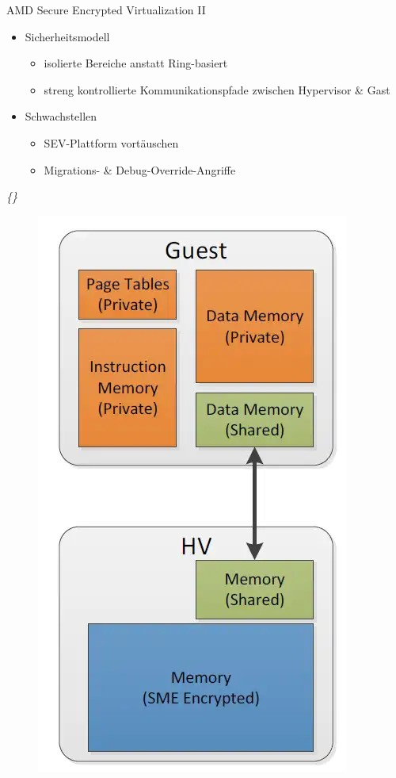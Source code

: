 \documentclass{sdqbeamer}
\begin{document}
\begin{frame}{AMD Secure Encrypted Virtualization II}
	\begin{minipage}{0.6\linewidth}
		\begin{itemize}
			\item Sicherheitsmodell
			\begin{itemize}
				\item isolierte Bereiche anstatt Ring-basiert
				\item streng kontrollierte Kommunikationspfade zwischen Hypervisor \& Gast
			\end{itemize}
			\item Schwachstellen
			\begin{itemize}
				\item SEV-Plattform vortäuschen
				\item Migrations- \& Debug-Override-Angriffe
			\end{itemize}
		\end{itemize}
		\vspace{3ex}
		\vfill
		\small\textit{\{\cite{kaplan, buhren}\}}
	\end{minipage}
	\begin{minipage}{0.39\linewidth}
		\begin{figure}[!h]
			\centering
			\includegraphics[width=0.45\linewidth]{Bilder/AMD_Guest_HV.jpg}

\end{figure}
\end{minipage}
\end{frame}
\end{document}
